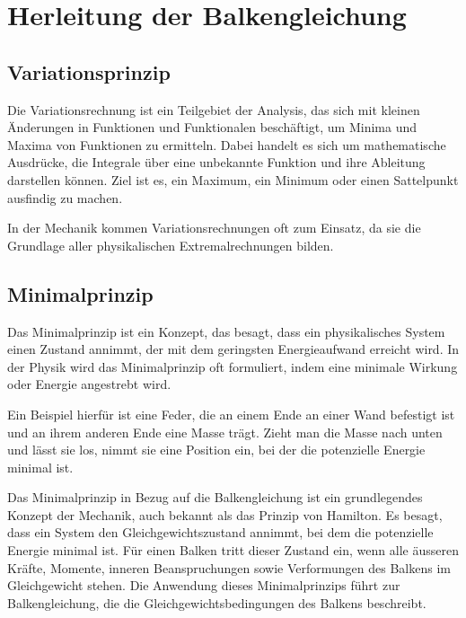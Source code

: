 %
%
%
%
\section{Herleitung der Balkengleichung
	\label{balken:section:teil2}}
\subsection{Variationsprinzip}
Die Variationsrechnung ist ein Teilgebiet der Analysis, das sich mit kleinen Änderungen in Funktionen und Funktionalen beschäftigt, um Minima und Maxima von Funktionen zu ermitteln. Dabei handelt es sich um mathematische Ausdrücke, die Integrale über eine unbekannte Funktion und ihre Ableitung darstellen können. Ziel ist es, ein Maximum, ein Minimum oder einen Sattelpunkt ausfindig zu machen.

In der Mechanik kommen Variationsrechnungen oft zum Einsatz, da sie die Grundlage aller physikalischen Extremalrechnungen bilden. \cite{balken:Variationsrechnung}

\subsection{Minimalprinzip}
Das Minimalprinzip ist ein Konzept, das besagt, dass ein physikalisches System einen Zustand annimmt, der mit dem geringsten Energieaufwand erreicht wird. In der Physik wird das Minimalprinzip oft formuliert, indem eine minimale Wirkung oder Energie angestrebt wird.

Ein Beispiel hierfür ist eine Feder, die an einem Ende an einer Wand befestigt ist und an ihrem anderen Ende eine Masse trägt. Zieht man die Masse nach unten und lässt sie los, nimmt sie eine Position ein, bei der die potenzielle Energie minimal ist.

Das Minimalprinzip in Bezug auf die Balkengleichung ist ein grundlegendes Konzept der Mechanik, auch bekannt als das Prinzip von Hamilton. Es besagt, dass ein System den Gleichgewichtszustand annimmt, bei dem die potenzielle Energie minimal ist. Für einen Balken tritt dieser Zustand ein, wenn alle äusseren Kräfte, Momente, inneren Beanspruchungen sowie Verformungen des Balkens im Gleichgewicht stehen. Die Anwendung dieses Minimalprinzips führt zur Balkengleichung, die die Gleichgewichtsbedingungen des Balkens beschreibt. 

